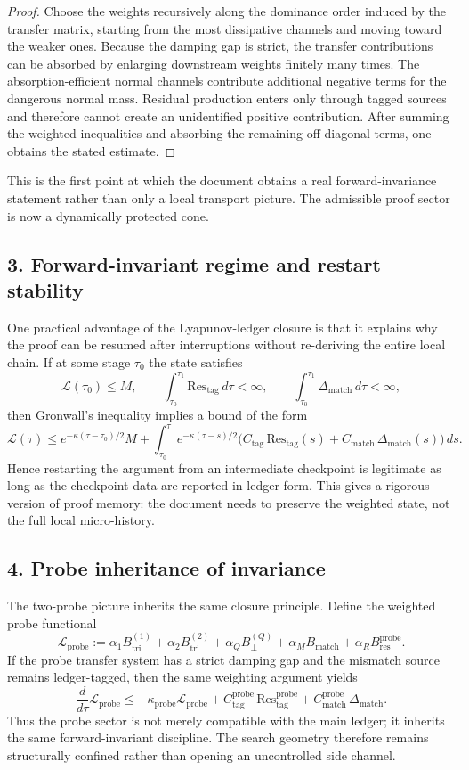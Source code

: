 \documentclass[12pt,a4paper]{article}
\begin{document}
\begin{proof}
Choose the weights recursively along the dominance order induced by the transfer
matrix, starting from the most dissipative channels and moving toward the weaker
ones. Because the damping gap is strict, the transfer contributions can be absorbed
by enlarging downstream weights finitely many times. The absorption-efficient normal
channels contribute additional negative terms for the dangerous normal mass. Residual
production enters only through tagged sources and therefore cannot create an
unidentified positive contribution. After summing the weighted inequalities and
absorbing the remaining off-diagonal terms, one obtains the stated estimate.
\end{proof}

This is the first point at which the document obtains a real forward-invariance
statement rather than only a local transport picture. The admissible proof sector is
now a dynamically protected cone.

\subsection*{3. Forward-invariant regime and restart stability}
One practical advantage of the Lyapunov-ledger closure is that it explains why the
proof can be resumed after interruptions without re-deriving the entire local chain.
If at some stage $\tau_0$ the state satisfies
\[
\mathcal L(\tau_0)\le M,
\qquad
\int_{\tau_0}^{\tau_1}\mathrm{Res}_{\mathrm{tag}}\,d\tau<\infty,
\qquad
\int_{\tau_0}^{\tau_1}\Delta_{\mathrm{match}}\,d\tau<\infty,
\]
then Gronwall's inequality implies a bound of the form
\[
\mathcal L(\tau)
\le e^{-\kappa(\tau-\tau_0)/2}M
+ \int_{\tau_0}^{\tau}e^{-\kappa(\tau-s)/2}
\bigl(C_{\mathrm{tag}}\,\mathrm{Res}_{\mathrm{tag}}(s)+C_{\mathrm{match}}\,\Delta_{\mathrm{match}}(s)\bigr)\,ds.
\]
Hence restarting the argument from an intermediate checkpoint is legitimate as long
as the checkpoint data are reported in ledger form. This gives a rigorous version of
proof memory: the document needs to preserve the weighted state, not the full local
micro-history.

\subsection*{4. Probe inheritance of invariance}
The two-probe picture inherits the same closure principle. Define the weighted probe
functional
\[
\mathcal L_{\mathrm{probe}}
:= \alpha_1 B^{(1)}_{\mathrm{tri}} + \alpha_2 B^{(2)}_{\mathrm{tri}}
+ \alpha_Q B^{(Q)}_{\perp} + \alpha_M B_{\mathrm{match}}
+ \alpha_R B^{\mathrm{probe}}_{\mathrm{res}}.
\]
If the probe transfer system has a strict damping gap and the mismatch source remains
ledger-tagged, then the same weighting argument yields
\[
\frac{d}{d\tau}\mathcal L_{\mathrm{probe}}
\le -\kappa_{\mathrm{probe}}\mathcal L_{\mathrm{probe}}
+ C^{\mathrm{probe}}_{\mathrm{tag}}\,\mathrm{Res}^{\mathrm{probe}}_{\mathrm{tag}}
+ C^{\mathrm{probe}}_{\mathrm{match}}\,\Delta_{\mathrm{match}}.
\]
Thus the probe sector is not merely compatible with the main ledger; it inherits the
same forward-invariant discipline. The search geometry therefore remains structurally
confined rather than opening an uncontrolled side channel.
\end{document}
